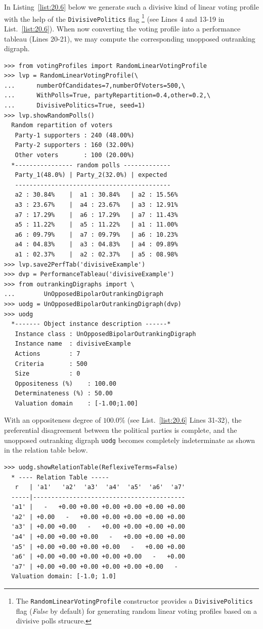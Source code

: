In Listing~\vref{list:20.6} below we generate such a divisive kind of linear voting profile with the help of the \texttt{DivisivePolitics} flag \footnote{The \texttt{RandomLinearVotingProfile} constructor provides a \texttt{DivisivePolitics} flag (\emph{False} by default) for generating random linear voting profiles based on a divisive polls strucure.} (see Lines 4 and 13-19 in List.~\vref{list:20.6}). When now converting the voting profile into a performance tableau (Lines 20-21), we may compute the corresponding unopposed outranking digraph.
\begin{lstlisting}[caption={A divisive two-party example of a random linear voting profile},label=list:20.6]
>>> from votingProfiles import RandomLinearVotingProfile		     
>>> lvp = RandomLinearVotingProfile(\
...      numberOfCandidates=7,numberOfVoters=500,\
...      WithPolls=True, partyRepartition=0.4,other=0.2,\
...      DivisivePolitics=True, seed=1)
>>> lvp.showRandomPolls()
  Random repartition of voters
   Party-1 supporters : 240 (48.00%)
   Party-2 supporters : 160 (32.00%)
   Other voters       : 100 (20.00%)
  *---------------- random polls -------------
   Party_1(48.0%) | Party_2(32.0%) | expected  
   -------------------------------------------
   a2 : 30.84%    |  a1 : 30.84%   | a2 : 15.56%
   a3 : 23.67%    |  a4 : 23.67%   | a3 : 12.91%
   a7 : 17.29%    |  a6 : 17.29%   | a7 : 11.43%
   a5 : 11.22%    |  a5 : 11.22%   | a1 : 11.00%
   a6 : 09.79%    |  a7 : 09.79%   | a6 : 10.23%
   a4 : 04.83%    |  a3 : 04.83%   | a4 : 09.89%
   a1 : 02.37%    |  a2 : 02.37%   | a5 : 08.98%
>>> lvp.save2PerfTab('divisiveExample')
>>> dvp = PerformanceTableau('divisiveExample')
>>> from outrankingDigraphs import \
...        UnOpposedBipolarOutrankingDigraph
>>> uodg = UnOpposedBipolarOutrankingDigraph(dvp)
>>> uodg
  *------- Object instance description ------*
   Instance class : UnOpposedBipolarOutrankingDigraph
   Instance name  : divisiveExample
   Actions        : 7
   Criteria       : 500
   Size           : 0
   Oppositeness (%)    : 100.00
   Determinateness (%) : 50.00
   Valuation domain    : [-1.00;1.00]
\end{lstlisting}
With an oppositeness degree of $100.0\%$ (see List.~\vref{list:20.6} Lines 31-32), the preferential disagreement between the political parties is complete, and the unopposed outranking digraph \texttt{uodg} becomes completely indeterminate as shown in the relation table below.
\begin{lstlisting}
>>> uodg.showRelationTable(ReflexiveTerms=False)
  * ---- Relation Table -----
   r   | 'a1'   'a2'  'a3'  'a4'  'a5'  'a6'  'a7'   
  -----|------------------------------------------
  'a1' |   -   +0.00 +0.00 +0.00 +0.00 +0.00 +0.00  
  'a2' | +0.00   -   +0.00 +0.00 +0.00 +0.00 +0.00  
  'a3' | +0.00 +0.00   -   +0.00 +0.00 +0.00 +0.00  
  'a4' | +0.00 +0.00 +0.00   -   +0.00 +0.00 +0.00  
  'a5' | +0.00 +0.00 +0.00 +0.00   -   +0.00 +0.00  
  'a6' | +0.00 +0.00 +0.00 +0.00 +0.00   -   +0.00  
  'a7' | +0.00 +0.00 +0.00 +0.00 +0.00 +0.00   -   
  Valuation domain: [-1.0; 1.0]
\end{lstlisting}      

